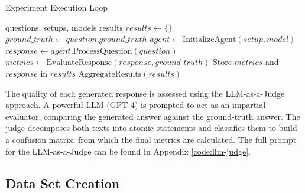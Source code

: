         \begin{algorithm}[h]
        \caption{Experiment Execution Loop}
        \begin{algorithmic}[1]
        \Require questions, setups, models
        \Ensure results
            \State $results \gets \{\}$
                \State $ground\_truth \gets question.ground\_truth$
                         
                            \State $agent \gets \text{InitializeAgent}(setup, model)$
                            \State $response \gets agent.\text{ProcessQuestion}(question)$
                            \State $metrics \gets \text{EvaluateResponse}(response, ground\_truth)$
                            \State Store $metrics$ and $response$ in $results$
                        \EndFor
                    \EndFor
                \EndFor
            \EndFor
            \State \Return $\text{AggregateResults}(results)$
        \EndFunction
        \end{algorithmic}
        \label{alg:execution_loop}
        \end{algorithm}

        The quality of each generated response is assessed using the LLM-as-a-Judge approach. A powerful LLM (GPT-4) is prompted to act as an impartial evaluator, comparing the generated answer against the ground-truth answer. The judge decomposes both texts into atomic statements and classifies them to build a confusion matrix, from which the final metrics are calculated. The full prompt for the LLM-as-a-Judge can be found in Appendix \ref{code:llm-judge}.

    \subsection{Data Set Creation}

